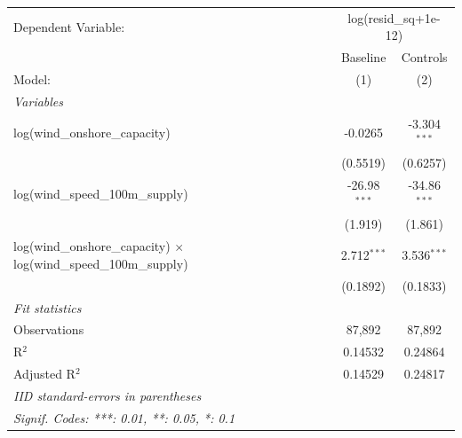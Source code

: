 \begin{tabular}{lcc}
   \tabularnewline \midrule \midrule
   Dependent Variable: & \multicolumn{2}{c}{log(resid\_sq+1e-12)}\\
                                                                              & Baseline       & Controls \\   
   Model:                                                                     & (1)            & (2)\\  
   \midrule
   \emph{Variables}\\
   log(wind\_onshore\_capacity)                                               & -0.0265        & -3.304$^{***}$\\   
                                                                              & (0.5519)       & (0.6257)\\   
   log(wind\_speed\_100m\_supply)                                             & -26.98$^{***}$ & -34.86$^{***}$\\   
                                                                              & (1.919)        & (1.861)\\   
   log(wind\_onshore\_capacity) $\times$ log(wind\_speed\_100m\_supply)       & 2.712$^{***}$  & 3.536$^{***}$\\   
                                                                              & (0.1892)       & (0.1833)\\   
   \midrule
   \emph{Fit statistics}\\
   Observations                                                               & 87,892         & 87,892\\  
   R$^2$                                                                      & 0.14532        & 0.24864\\  
   Adjusted R$^2$                                                             & 0.14529        & 0.24817\\  
   \midrule \midrule
   \multicolumn{3}{l}{\emph{IID standard-errors in parentheses}}\\
   \multicolumn{3}{l}{\emph{Signif. Codes: ***: 0.01, **: 0.05, *: 0.1}}\\
\end{tabular}
